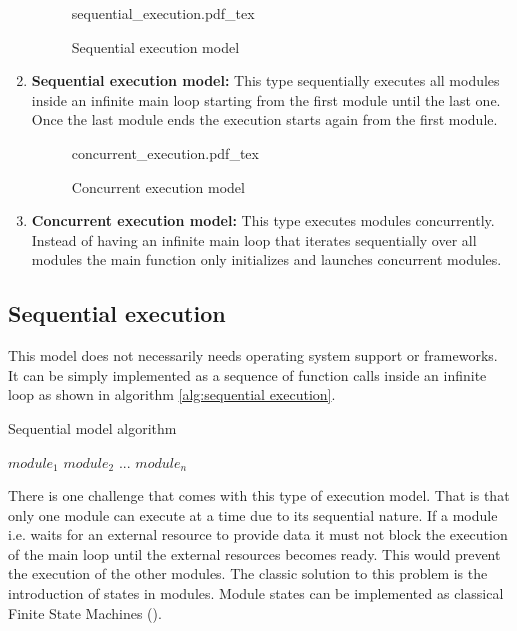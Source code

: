 \begin{enumerate}

\begin{figure}[H]
    \centering
    {sequential_execution.pdf_tex}
    \caption{Sequential execution model}
\end{figure}

\item \textbf{Sequential execution model:} This type sequentially executes all modules inside an infinite main loop starting from the first module until the last one. Once the last module ends the execution starts again from the first module.

\begin{figure}[H]
\centering
{concurrent_execution.pdf_tex}
\caption[]{Concurrent execution model}

\end{figure}
\item \textbf{Concurrent execution model:} This type executes modules concurrently. Instead of having an infinite main loop that iterates sequentially over all modules the main function only initializes and launches concurrent modules.
\end{enumerate}

\subsection{Sequential execution}
This model does not necessarily needs operating system support or frameworks. It can be simply implemented as a sequence of function calls inside an infinite loop as shown in algorithm \ref{alg:sequential execution}.

\begin{algorithm}[H]
\caption{Sequential model algorithm}
\label{alg:sequential execution}
\begin{algorithmic}
\STATE $module_1$
\STATE $module_2$
\STATE $...$
\STATE $module_n$
\ENDWHILE
\end{algorithmic}
\end{algorithm}

There is one challenge that comes with this type of execution model. That is that only one module can execute at a time due to its sequential nature. If a module i.e. waits for an external resource to provide data it must not block the execution of the main loop until the external resources becomes ready. This would prevent the execution of the other modules. The classic solution to this problem is the introduction of states in modules. Module states can be implemented as classical Finite State Machines (\cite{booth}).

